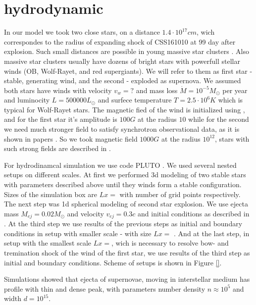 \documentclass[a4paper,12pt]{extreport}
\begin{document}
\section{hydrodynamic}\label{hydrodynamic}
In our model we took two close stars, on a distance $1.4\cdot10^{17} cm$, wich correspondes to the radius of expanding shock of CSS161010 at 99 day after explosion. Such small distances are possible in young massive star clusters \cite{}. Also massive star clusters usually have dozens of bright stars with powerfull stellar winds (OB, Wolf-Rayet, and red supergiants). We will refer to them as first star - stable, generating wind, and the second - exploded as supernova. We assumed both stars have winds with velocity $v_w = ?$ and mass loss $\dot{M} = 10^{-5} M_\odot $ per year and luminocity $L=500000 L_\odot$ and surfece temperature $T = 2.5\cdot10^6 K$ which is typical for Wolf-Rayet stars. The magnetic fied of the wind is initialized using \cite{}, and for the first star  it's amplitude is $100 G$ at the radius $10$ while for the second we need much stronger field to satisfy synchrotron observational data, as it is shown in papers \cite{Coppejans2020, BykovUniverse}. So we took magnetic field $1000 G$ at the radius $10^{12}$, stars with such strong fields are described in \cite{}.

For hydrodinamcal simulation we use code PLUTO \cite{MignonePluto}. We used several nested setups on different scales. At first we performed 3d modeling of two stable stars with parameters described above until they winds form a stable configuration. Sizes of the simulation box are $Lx = $ with number of grid points respectively. The next step was 1d spherical modeling of second star explosion. We use ejecta mass $M_{ej} = 0.02 M_\odot$ and velocity $v_{ej} = 0.3 c$ and initial conditions as described in \cite{}. At the third step we use results of the previous steps as initial and boundary conditions in setup with smaller scale - with size $Lx = $ . And at the last step, in setup with the smallest scale $Lx = $, wich is necessary to resolve bow- and tremination shock of the wind of the first star, we use results of the third step as initial and boundary conditions. Scheme of setups is shown in Figure \ref{}.

Simulations showed that ejecta of supernovae, moving in interstellar medium has profile with thin and dense peak, with parameters number density $n \approx 10^5$ and width $d = 10^{15}$.
\end{document}
